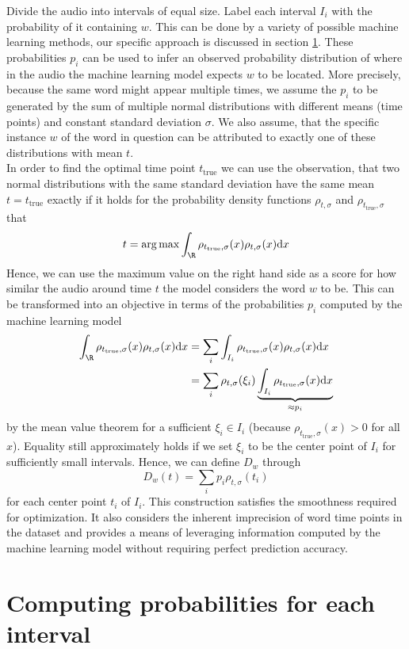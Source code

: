 Divide the audio into intervals of equal size. Label each interval $I_i$ with the probability of it containing $w$. This can be done by a variety of possible machine learning methods, our specific approach is discussed in section \ref{interval_word_prob}. These probabilities $p_i$ can be used to infer an observed probability distribution of where in the audio the machine learning model expects $w$ to be located. More precisely, because the same word might appear multiple times, we assume the $p_i$ to be generated by the sum of multiple normal distributions with different means (time points) and constant standard deviation $\sigma$. We also assume, that the specific instance $w$ of the word in question can be attributed to exactly one of these distributions with mean $t$.\\
In order to find the optimal time point $t_\text{true}$ we can use the observation, that two normal distributions with the same standard deviation have the same mean $t=t_\text{true}$ exactly if it holds for the probability density functions $\rho_{t,\sigma}$ and $\rho_{t_\text{true},\sigma}$ that
\[t = \arg\max \int_\R \rho_{t_\text{true},\sigma}(x)\rho_{t,\sigma}(x)\text{d}x\]
Hence, we can use the maximum value on the right hand side as a score for how similar the audio around time $t$ the model considers the word $w$ to be. This can be transformed into an objective in terms of the probabilities $p_i$ computed by the machine learning model
\begin{align*}
	\int_\R \rho_{t_\text{true},\sigma}(x)\rho_{t,\sigma}(x)\text{d}x &= \sum_{i} \int_{I_i} \rho_{t_\text{true},\sigma}(x)\rho_{t,\sigma}(x)\text{d}x\\
			&= \sum_i \rho_{t,\sigma}(\xi_i) \underbrace{\int_{I_i} \rho_{t_\text{true},\sigma}(x)\text{d}x}_{\approx p_i}
\end{align*}
by the mean value theorem for a sufficient $\xi_i\in I_i$ (because $\rho_{t_\text{true},\sigma}(x) > 0$ for all $x$). Equality still approximately holds if we set $\xi_i$ to be the center point of $I_i$ for sufficiently small intervals.
Hence, we can define $D_w$ through
\[
	D_w(t) = \sum_i p_i \rho_{t,\sigma}(t_i)
\]
for each center point $t_i$ of $I_i$. This construction satisfies the smoothness required for optimization. It also considers the inherent imprecision of word time points in the dataset and provides a means of leveraging information computed by the machine learning model without requiring perfect prediction accuracy.

\section{Computing probabilities for each interval}
\label{interval_word_prob}

